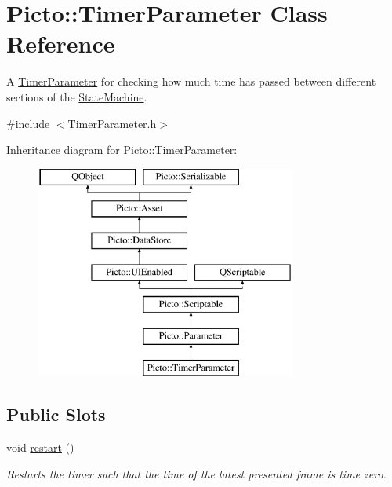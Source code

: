 \hypertarget{class_picto_1_1_timer_parameter}{\section{Picto\-:\-:Timer\-Parameter Class Reference}
\label{class_picto_1_1_timer_parameter}
}


A \hyperlink{class_picto_1_1_timer_parameter}{Timer\-Parameter} for checking how much time has passed between different sections of the \hyperlink{class_picto_1_1_state_machine}{State\-Machine}.  




{\ttfamily \#include $<$Timer\-Parameter.\-h$>$}

Inheritance diagram for Picto\-:\-:Timer\-Parameter\-:\begin{figure}[H]
\begin{center}
\leavevmode
\includegraphics[height=7.000000cm]{class_picto_1_1_timer_parameter}
\end{center}
\end{figure}
\subsection*{Public Slots}
\begin{DoxyCompactItemize}
\item 
\hypertarget{class_picto_1_1_timer_parameter_ae77dae4dbc2b5309d6edcec4d8ca4471}{void \hyperlink{class_picto_1_1_timer_parameter_ae77dae4dbc2b5309d6edcec4d8ca4471}{restart} ()}\label{class_picto_1_1_timer_parameter_ae77dae4dbc2b5309d6edcec4d8ca4471}

\begin{DoxyCompactList}\small\item\em Restarts the timer such that the time of the latest presented frame is time zero. \end{DoxyCompactList}\end{DoxyCompactItemize}
